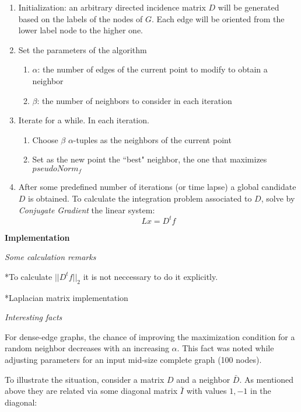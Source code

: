 \documentclass[a4paper,11pt]{article}
\begin{document}
\begin{enumerate}
	\item Initialization: an arbitrary directed incidence matrix $D$ 
	will be generated based on the labels of the nodes of $G$. Each edge 
	will be oriented from the lower label node to the higher one. 
	\item Set the parameters of the algorithm
	\begin{enumerate}
		\item $\alpha$: the number of edges of the current point to 
		modify to obtain a neighbor
		\item $\beta$: the number of neighbors to consider in each 
		iteration
	\end{enumerate}
	\item Iterate for a while. In each iteration.
	\begin{enumerate}
		\item Choose $\beta$ $\alpha$-tuples as the neighbors of the
		current point
		\item Set as the new point the ``best" neighbor, the one that 
		maximizes $pseudoNorm_f$
 	\end{enumerate}
	\item After some predefined number of iterations (or time lapse) a  
	global candidate $D$ is obtained. To calculate the integration 
	problem associated to $D$, solve by \textit{Conjugate Gradient} 
	the linear system:
	$$L x = D^t f$$
\end{enumerate}

\bigskip

\textbf{Implementation}

\bigskip

\emph{Some calculation remarks}

\bigskip

*To calculate $||D^t f||_2$ it is not neccessary to do it explicitly.

*Laplacian matrix implementation

\bigskip

\emph{Interesting facts}

\bigskip

For dense-edge graphs, the chance of improving the maximization 
condition for a random neighbor decreases with an increasing $\alpha$. 
This fact was noted while adjusting parameters for an input mid-size 
complete graph (100 nodes). 

\bigskip

To illustrate the situation, consider a matrix $D$ and a neighbor 
$\bar{D}$. As mentioned above they are related via some diagonal matrix 
$\bar{I}$ with values $1,-1$ in the diagonal:
\end{document}
